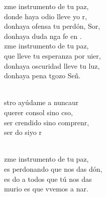 \begin{cancion}%
	zme instrumento de tu paz,\\
	donde haya odio lleve yo r,\\
	donhaya ofensa tu perdón, Sor,\\
	donhaya duda nga fe en . \\
	zme instrumento de tu paz,\\
	que lleve tu esperanza por uier,\\
	donhaya oscuridad lleve tu luz,\\
	donhaya pena tgozo Señ. \\\jump\\
	\begin{chorus}%
	stro ayúdame a nuncaur\\
	querer  consol sino cso,\\
	ser crendido sino comprenr,\\
	ser do siyo r\\
	\end{chorus}%
	\jump\\
	zme instrumento de tu paz,\\
	es perdonando que nos das dón,\\
	es do a todos que tú nos das\\
	murio es que vvemos a nar.\\
\end{cancion}%
